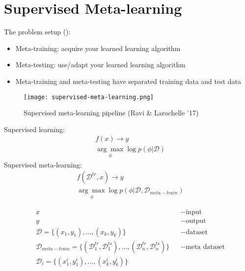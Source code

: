 \section{Supervised Meta-learning}
The problem setup ():
\begin{itemize}
	\item Meta-training: acquire your learned learning algorithm
	\item Meta-testing: use/adapt your learned learning algorithm
	\item Meta-training and meta-testing have separated training data and test data
\end{itemize}

\begin{figure}[hbt!]
	\centering
	\texttt{[image: supervised-meta-learning.png]}
	\caption{Supervised meta-learning pipeline (Ravi \& Larochelle '17)}
	\label{fig:supervised-meta-learning}
\end{figure}

\begin{multicols}{2}
	Supervised learning:
	\begin{align*}
		&f(x) \rightarrow y\\
		&\underset{\phi}{\arg\max} \log p(\phi | \mathcal{D})
	\end{align*}	
	Supervised meta-learning:
	\begin{align*}
		&f(\mathcal{D}^{tr}, x) \rightarrow y\\
		&\underset{\phi}{\arg\max} \log p(\phi | \mathcal{D}, \mathcal{D}_{meta-train})
	\end{align*}
\end{multicols}
\begin{align*}
	&x &&-\text{input}\\
	&y &&-\text{output}\\
	&\mathcal{D} = \{(x_1, y_1), \dots, (x_k, y_k)\} &&-\text{dataset}\\
	&\mathcal{D}_{meta-train} = \{(\mathcal{D}_1^{tr}, \mathcal{D}_1^{ts}), \dots, (\mathcal{D}_n^{tr}, \mathcal{D}_n^{ts})\} &&-\text{meta dataset}\\
	&\mathcal{D}_i = \{(x_1^i, y_1^i), \dots, (x_k^i, y_k^i)\}
\end{align*}


